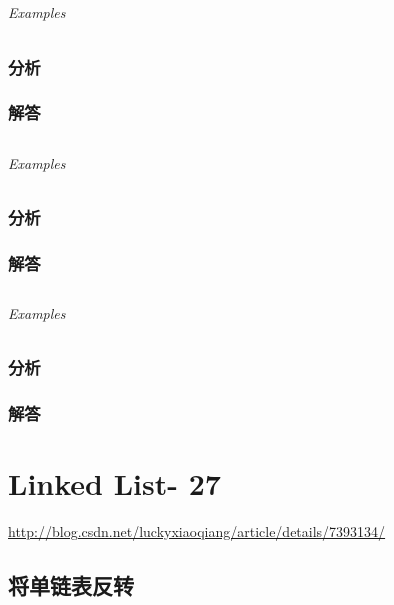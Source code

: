 \documentclass[UTF8,a4paper,12pt]{ctexbook}
\begin{document}
	
\section{}
	
	\subparagraph{Examples}
	
	\subsection{分析}
	
	\subsection{解答}
	
	
\section{}
	
	\subparagraph{Examples}
	
	\subsection{分析}
	
	\subsection{解答}
	
	
\section{}
	
	\subparagraph{Examples}
	
	\subsection{分析}
	
	\subsection{解答}
\chapter{Linked List- 27}
	\url{http://blog.csdn.net/luckyxiaoqiang/article/details/7393134/}
\section{将单链表反转}
	
\end{document}
